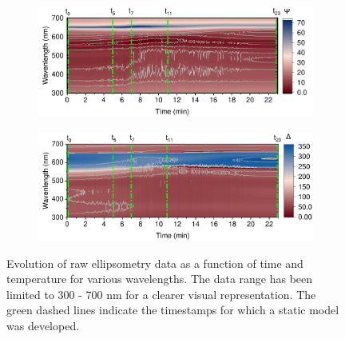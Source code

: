 \begin{figure}[htbp]
    \centering
    \begin{subfigure}[t]{0.95\textwidth} %
        \centering
        \includegraphics[width=\textwidth]{chapters/ellipsometry/image/Psi_Contour - MRS.pdf} %
    \end{subfigure}

    \vspace{1em} %

    \begin{subfigure}[t]{0.95\textwidth} %
        \centering
        \includegraphics[width=\textwidth]{chapters/ellipsometry/image/Delta_Contour - MRS.pdf} %
    \end{subfigure}

    \caption{Evolution of raw ellipsometry data as a function of time and temperature for various wavelengths. The data range has been limited to 300 - 700 nm for a clearer visual representation. The green dashed lines indicate the timestamps for which a static model was developed.}
    \label{fig:ellipsometry:raw_psi_delta}
\end{figure}



